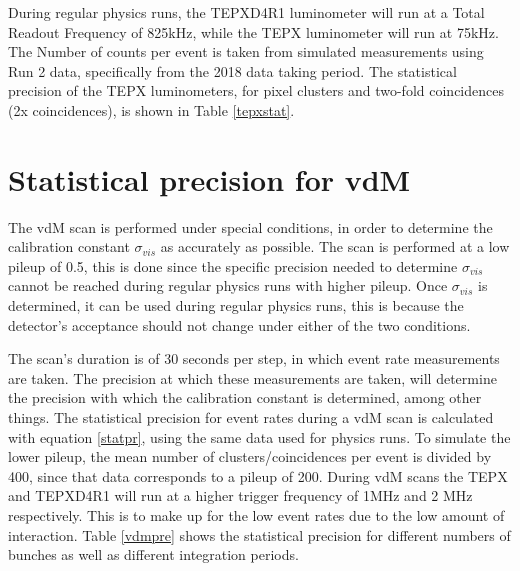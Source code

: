 During regular physics runs, the TEPXD4R1 luminometer will run at a Total Readout Frequency of 825kHz, while the TEPX luminometer will run at 75kHz. The Number of counts per event is taken from simulated measurements using Run 2 data, specifically from the 2018 data taking period. The statistical precision of  the TEPX luminometers, for pixel clusters and two-fold coincidences (2x coincidences), is shown in Table \ref{tepxstat}.
\begin{table}[H]
\centering
\caption[Statistical precision of the TEPX luminometers in \% for pileup 200.]{Statistical precision of the TEPX luminometers in \% for pileup 200. Columns shown are the luminometer readout frequency, and estimated precision for 1 bunch crossing and 2748 colliding bunches for integrated of 1s.}
\label{tepxstat}
\end{table}



\section{Statistical precision for vdM }
The vdM scan is performed under special conditions, in order to determine the calibration constant $\sigma_{vis}$ as accurately as possible. The scan is performed at a low pileup of 0.5, this is done since the specific precision needed to determine $\sigma_{vis}$ cannot be reached during regular physics runs with higher pileup. Once  $\sigma_{vis}$ is determined, it can be used during regular physics runs, this is because the detector's acceptance should not change under either of the two conditions. 

The scan's duration is of 30 seconds per step, in which event rate measurements are taken. The precision at which these measurements are taken, will determine the precision with which the calibration constant is determined, among other things. The statistical precision for event rates during a vdM scan is calculated with equation \ref{statpr}, using the same data used for physics runs. To simulate the lower pileup, the mean number of clusters/coincidences per event is divided by 400, since that data corresponds to a pileup of 200.  During vdM scans the TEPX and TEPXD4R1 will run at a higher trigger frequency of 1MHz and 2 MHz respectively. This is to make up for the low event rates due to the low amount of interaction.  Table \ref{vdmpre} shows the statistical precision for different numbers of bunches as well as different integration periods.

